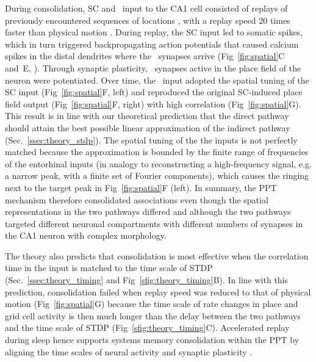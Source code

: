 During consolidation, SC and \ppca~input to the CA1 cell consisted of replays of previously encountered sequences of locations \cite{Skaggs1996, Lee2002}, with a replay speed 20 times faster than physical motion \cite{Lee2002}.
During replay, the SC input led to somatic spikes, which in turn triggered backpropagating action potentials that caused calcium spikes in the distal dendrites where the \ppca~synapses arrive (Fig~\ref{fig:spatial}C and~E, \cite{Larkum1999}).
Through synaptic plasticity, \ppca~synapses active in the place field of the neuron were potentiated.
Over time, the \ppca~input adopted the spatial tuning of the SC input (Fig~\ref{fig:spatial}F, left) and reproduced the original SC-induced place field output (Fig~\ref{fig:spatial}F, right) with high correlation (Fig~\ref{fig:spatial}G). This result is in line with our theoretical prediction that the direct pathway should attain the best possible linear approximation of the indirect pathway (Sec.~\ref{ssec:theory_stdp}). The spatial tuning of the the inputs is not perfectly matched because the approximation is bounded by the finite range of frequencies of the entorhinal inputs (in analogy to reconstructing a high-frequency signal, e.g. a narrow peak, with a finite set of Fourier components), which causes the ringing next to the target peak in Fig~\ref{fig:spatial}F (left). In summary, the PPT mechanism therefore consolidated associations even though the spatial representations in the two pathways differed and although the two pathways targeted different neuronal compartments with different numbers of synapses in the CA1 neuron with complex morphology.

The theory also predicts that consolidation is most effective when the correlation time in the input is matched to the time scale of STDP (Sec.~\ref{ssec:theory_timing} and Fig~\ref{sfig:theory_timing}B). In line with this prediction, consolidation failed when replay speed was reduced to that of physical motion (Fig~\ref{fig:spatial}G) because the time scale of rate changes in place and grid cell activity is then much longer than the delay between the two pathways and the time scale of STDP (Fig~\ref{sfig:theory_timing}C). Accelerated replay during sleep \cite{Lee2002} hence supports systems memory consolidation within the PPT by aligning the time scales of neural activity and synaptic plasticity \cite{DAlbis2015}.

